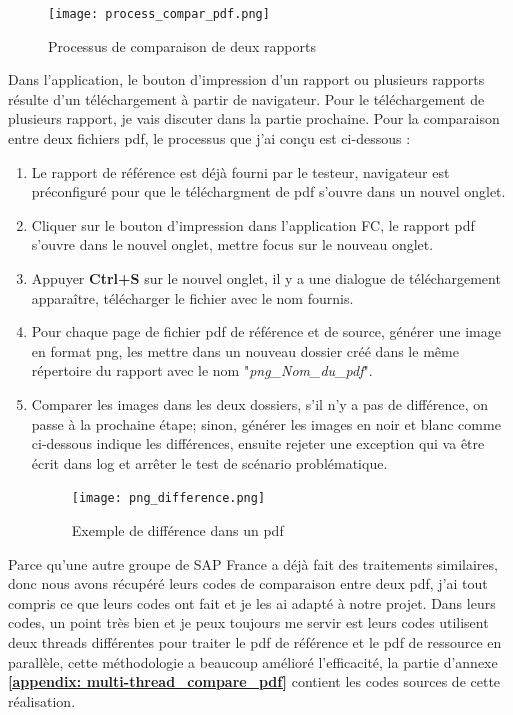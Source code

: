     \begin{figure}[H]
        \centering
        \texttt{[image: process\_compar\_pdf.png]}
        \caption{Processus de comparaison de deux rapports}
        \label{fig:proc_compar_report_label}
    \end{figure}
    Dans l'application, le bouton d'impression d'un rapport ou plusieurs rapports résulte d'un téléchargement à partir de navigateur. Pour le téléchargement de plusieurs rapport, je vais discuter dans la partie prochaine. Pour la comparaison entre deux fichiers pdf, le processus que j'ai conçu est ci-dessous : 
    \begin{enumerate}[label=\arabic*)]
        \item Le rapport de référence est déjà fourni par le testeur, navigateur est préconfiguré pour que le téléchargment de pdf s'ouvre dans un nouvel onglet.
        \item Cliquer sur le bouton d'impression dans l'application FC, le rapport pdf s'ouvre dans le nouvel onglet, mettre focus sur le nouveau onglet.
        \item Appuyer \textbf{Ctrl+S} sur le nouvel onglet, il y a une dialogue de téléchargement apparaître, télécharger le fichier avec le nom fournis.
        \item Pour chaque page de fichier pdf de référence et de source, générer une image en format png, les mettre dans un nouveau dossier créé dans le même répertoire du rapport avec le nom "\textit{png\_Nom\_du\_pdf}".
        \item Comparer les images dans les deux dossiers, s'il n'y a pas de différence, on passe à la prochaine étape; sinon, générer les images en noir et blanc comme ci-dessous indique les différences, ensuite rejeter une exception qui va être écrit dans log et arrêter le test de scénario problématique.
        \begin{figure}[H]
            \centering
            \texttt{[image: png\_difference.png]}
            \caption{Exemple de différence dans un pdf}
            \label{fig:exemple_pdf_diff_label}
        \end{figure}
    \end{enumerate}
    
    Parce qu'une autre groupe de SAP France a déjà fait des traitements similaires, donc nous avons récupéré leurs codes de comparaison entre deux pdf, j'ai tout compris ce que leurs codes ont fait et je les ai adapté à notre projet. Dans leurs codes, un point très bien et je peux toujours me servir est leurs codes utilisent deux threads différentes pour traiter le pdf de référence et le pdf de ressource en parallèle, cette méthodologie a beaucoup amélioré l'efficacité, la partie d'annexe \textbf{\ref{appendix: multi-thread_compare_pdf}} contient les codes sources de cette réalisation. 
    
